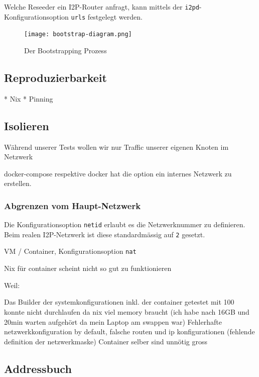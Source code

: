 Welche Reseeder ein I2P-Router anfragt, kann mittels der \lstinline|i2pd|-Konfigurationsoption \lstinline|urls| festgelegt werden.


\clearpage
\begin{landscape}%
\begin{figure}[ht]
  \texttt{[image: bootstrap-diagram.png]}
  \caption{Der Bootstrapping Prozess}\label{fig:bootstrap-diagram}
\end{figure}
\end{landscape}%


\subsection{Reproduzierbarkeit}

* Nix
* Pinning
    
\cite{noauthor_nixops_nodate-5}


\subsection{Isolieren}

Während unserer Tests wollen wir nur Traffic unserer eigenen Knoten im Netzwerk 

docker-compose respektive docker hat die option ein internes Netzwerk zu erstellen.

\subsubsection{Abgrenzen vom Haupt-Netzwerk}

Die Konfigurationsoption \lstinline|netid| erlaubt es die Netzwerknummer zu definieren.
Beim realen I2P-Netzwerk ist diese standardmässig auf \lstinline|2| gesetzt.

VM / Container, Konfigurationsoption \lstinline|nat|

Nix für container scheint nicht so gut zu funktionieren

Weil:

Das Builder der systemkonfigurationen inkl. der container getestet mit 100 konnte nicht durchlaufen da nix viel memory braucht (ich habe nach 16GB und 20min warten aufgehört da mein Laptop am swappen war)
Fehlerhafte netzwerkkonfiguration by default, falsche routen und ip konfigurationen (fehlende definition der netzwerkmaske)
Container selber sind unnötig gross

\subsection{Addressbuch}

